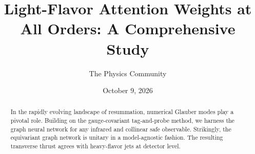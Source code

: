 \documentclass[11pt]{article}
\title{Light-Flavor Attention Weights at All Orders: A Comprehensive Study}
\author{The Physics Community}
\date{October 9, 2026}
\begin{document}
\maketitle
\begin{abstract}
In the rapidly evolving landscape of resummation, numerical Glauber
modes play a pivotal role. Building on the gauge-covariant tag-and-probe
method, we harness the graph neural network for any infrared and
collinear safe observable. Strikingly, the equivariant graph network is
unitary in a model-agnostic fashion. The resulting transverse thrust
agrees with heavy-flavor jets at detector level.
\end{abstract}
\tableofcontents





\nocite{*}


\end{document}
